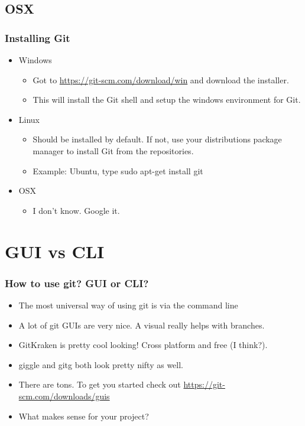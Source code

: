 \documentclass{beamer}
\begin{document}
\subsection{OSX}
\begin{frame}
    \frametitle{Installing Git}
    \begin{itemize}

        \item{Windows}
        \begin{itemize}
            \item{Got to \url{https://git-scm.com/download/win} and download the installer.}
            \item{This will install the Git shell and setup the windows environment for Git.}
        \end{itemize}

        \item{Linux}
        \begin{itemize}
                \item{Should be installed by default. If not, use your distributions package manager to install Git from the repositories.}
                \item{Example: Ubuntu, type sudo apt-get install git}
        \end{itemize}

        \item{OSX}
        \begin{itemize}
            \item{I don't know. Google it.}
        \end{itemize}

    \end{itemize}
\end{frame} 

\section{GUI vs CLI}
\begin{frame}
    \frametitle{How to use git? GUI or CLI?}
    \begin{itemize}
        \item{The most universal way of using git is via the command line}
        \item{A lot of git GUIs are very nice. A visual really helps with branches.}
        \item{GitKraken is pretty cool looking! Cross platform and free (I think?).}
        \item{giggle and gitg both look pretty nifty as well.}
        \item{There are tons. To get you started check out \url{https://git-scm.com/downloads/guis}}
        \item{What makes sense for your project?}
    \end{itemize}
\end{frame}
\end{document}
